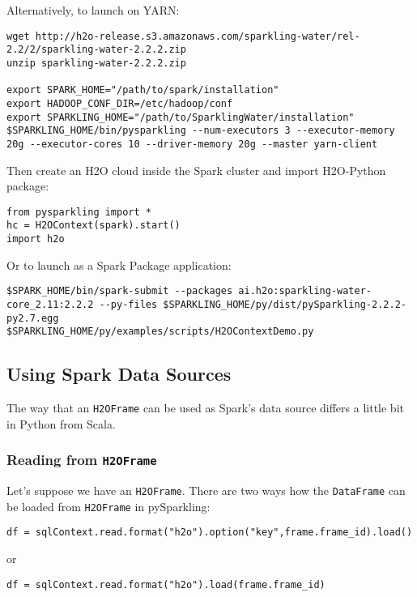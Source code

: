 Alternatively, to launch on YARN:

\begin{lstlisting}[style=Bash]
wget http://h2o-release.s3.amazonaws.com/sparkling-water/rel-2.2/2/sparkling-water-2.2.2.zip
unzip sparkling-water-2.2.2.zip
 
export SPARK_HOME="/path/to/spark/installation"
export HADOOP_CONF_DIR=/etc/hadoop/conf
export SPARKLING_HOME="/path/to/SparklingWater/installation"
$SPARKLING_HOME/bin/pysparkling --num-executors 3 --executor-memory 20g --executor-cores 10 --driver-memory 20g --master yarn-client
\end{lstlisting}
    
Then create an H2O cloud inside the Spark cluster and import H2O-Python package:
\begin{lstlisting}[style=Scala]
from pysparkling import *
hc = H2OContext(spark).start()
import h2o
\end{lstlisting}

Or to launch as a Spark Package application:
\begin{lstlisting}[style=Bash]
$SPARK_HOME/bin/spark-submit --packages ai.h2o:sparkling-water-core_2.11:2.2.2 --py-files $SPARKLING_HOME/py/dist/pySparkling-2.2.2-py2.7.egg
$SPARKLING_HOME/py/examples/scripts/H2OContextDemo.py 
\end{lstlisting}


\subsection{Using Spark Data Sources}

The way that an \texttt{H2OFrame} can be used as Spark's data source differs a little bit in Python from Scala.

\subsubsection{Reading from \texttt{H2OFrame}}

Let's suppose we have an \texttt{H2OFrame}. There are two ways how the \texttt{DataFrame} can be loaded from \texttt{H2OFrame} in pySparkling:
\begin{lstlisting}[style=Scala]
df = sqlContext.read.format("h2o").option("key",frame.frame_id).load()
\end{lstlisting}
or
\begin{lstlisting}[style=Scala]
df = sqlContext.read.format("h2o").load(frame.frame_id)
\end{lstlisting}

